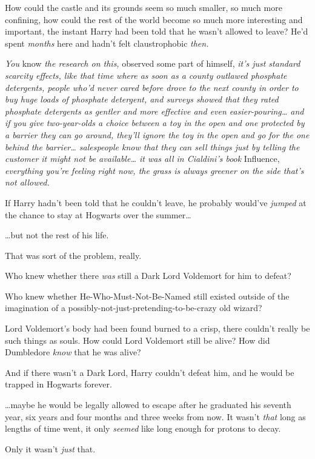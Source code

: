 How could the castle and its grounds seem so much smaller, so much more 
confining, how could the rest of the world become so much more interesting and 
important, the instant Harry had been told that he wasn't allowed to leave? 
He'd spent \emph{months} here and hadn't felt claustrophobic \emph{then.}

\emph{You} know\emph{ the research on this,} observed some part of himself, 
\emph{it's just standard scarcity effects, like that time where as soon as a 
county outlawed phosphate detergents, people who'd never cared before drove to 
the next county in order to buy huge loads of phosphate detergent, and surveys 
showed that they rated phosphate detergents as gentler and more effective and 
even easier-pouring{\ldots} and if you give two-year-olds a choice between a 
toy in the open and one protected by a barrier they can go around, they'll 
ignore the toy in the open and go for the one behind the barrier{\ldots} 
salespeople know that they can sell things just by telling the customer it 
might not be available{\ldots} it was all in Cialdini's book} Influence,\emph{ 
everything you're feeling right now, the grass is always greener on the side 
that's not allowed.}

If Harry hadn't been told that he couldn't leave, he probably would've 
\emph{jumped} at the chance to stay at Hogwarts over the summer{\ldots}

{\ldots}but not the rest of his life.

That was sort of the problem, really.

Who knew whether there \emph{was} still a Dark Lord Voldemort for him to defeat?

Who knew whether He-Who-Must-Not-Be-Named still existed outside of the 
imagination of a possibly-not-just-pretending-to-be-crazy old wizard?

Lord Voldemort's body had been found burned to a crisp, there couldn't really 
be such things as souls. How could Lord Voldemort still be alive? How did 
Dumbledore \emph{know} that he was alive?

And if there wasn't a Dark Lord, Harry couldn't defeat him, and he would be 
trapped in Hogwarts forever.

{\ldots}maybe he would be legally allowed to escape after he graduated his 
seventh year, six years and four months and three weeks from now. It wasn't 
\emph{that} long as lengths of time went, it only \emph{seemed} like long 
enough for protons to decay.

Only it wasn't \emph{just} that.

